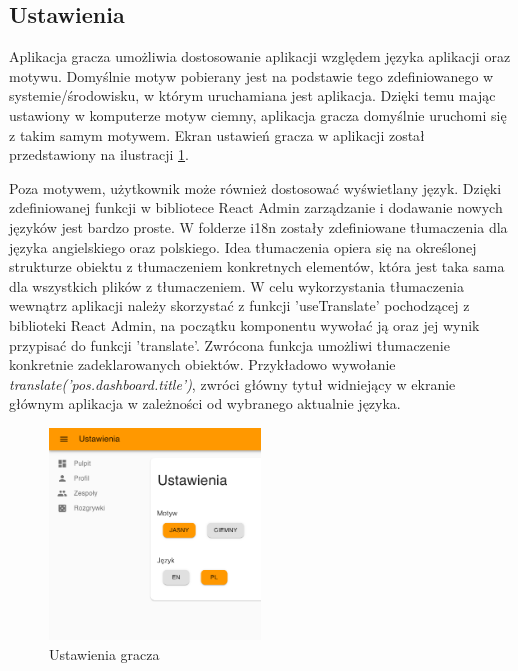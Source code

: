\subsection{Ustawienia}
Aplikacja gracza umożliwia dostosowanie aplikacji względem języka aplikacji oraz motywu. Domyślnie motyw pobierany jest na podstawie tego zdefiniowanego w systemie/środowisku, w którym uruchamiana jest aplikacja. Dzięki temu mając ustawiony w komputerze motyw ciemny, aplikacja gracza domyślnie uruchomi się z takim samym motywem. Ekran ustawień gracza w aplikacji został przedstawiony na ilustracji \ref{fig:settings}.

Poza motywem, użytkownik może również dostosować wyświetlany język. Dzięki zdefiniowanej funkcji w bibliotece React Admin zarządzanie i dodawanie nowych języków jest bardzo proste. W folderze i18n zostały zdefiniowane tłumaczenia dla języka angielskiego oraz polskiego. Idea tłumaczenia opiera się na określonej strukturze obiektu z tłumaczeniem konkretnych elementów, która jest taka sama dla wszystkich plików z tłumaczeniem. W celu wykorzystania tłumaczenia wewnątrz aplikacji należy skorzystać z funkcji 'useTranslate' pochodzącej z biblioteki React Admin, na początku komponentu wywołać ją oraz jej wynik przypisać do funkcji 'translate'. Zwrócona funkcja umożliwi tłumaczenie konkretnie zadeklarowanych obiektów. Przykładowo wywołanie \textit{translate('pos.dashboard.title')}, zwróci główny tytuł widniejący w ekranie głównym aplikacja w zależności od wybranego aktualnie języka.

\begin{figure}[h!]
  \centering
    \includegraphics[width=0.5\textwidth]{images/player/settings.png}
  \caption{Ustawienia gracza}
  \label{fig:settings}
\end{figure}

